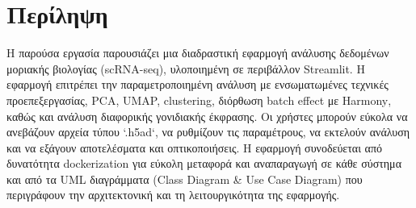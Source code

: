 \chapter*{Περίληψη}

Η παρούσα εργασία παρουσιάζει μια διαδραστική εφαρμογή ανάλυσης δεδομένων μοριακής βιολογίας \foreignlanguage{english}{(scRNA-seq)}, υλοποιημένη σε περιβάλλον \foreignlanguage{english}{Streamlit}. Η εφαρμογή επιτρέπει την παραμετροποιημένη ανάλυση με ενσωματωμένες τεχνικές προεπεξεργασίας, \foreignlanguage{english}{PCA, UMAP, clustering}, διόρθωση \foreignlanguage{english}{batch effect} με \foreignlanguage{english}{Harmony}, καθώς και ανάλυση διαφορικής γονιδιακής έκφρασης. Οι χρήστες μπορούν εύκολα να ανεβάζουν αρχεία τύπου \foreignlanguage{english}{`.h5ad`}, να ρυθμίζουν τις παραμέτρους, να εκτελούν ανάλυση και να εξάγουν αποτελέσματα και οπτικοποιήσεις. Η εφαρμογή συνοδεύεται από δυνατότητα \foreignlanguage{english}{dockerization} για εύκολη μεταφορά και αναπαραγωγή σε κάθε σύστημα και από τα \foreignlanguage{english}{UML} διαγράμματα \foreignlanguage{english}{(Class Diagram \& Use Case Diagram)} που περιγράφουν την αρχιτεκτονική και τη λειτουργικότητα της εφαρμογής.